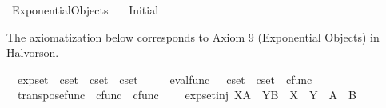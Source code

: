 %
\begin{isabellebody}%
%
%
\isadelimtheory
%
\endisadelimtheory
%
\isatagtheory
{}\isamarkupfalse%
\ Exponential{\isacharunderscore}{\kern0pt}Objects\isanewline
\ \ \ Initial\isanewline
{}%
\endisatagtheory
{\isafoldtheory}%
%
\isadelimtheory
%
\endisadelimtheory
%
\isadelimdocument
%
\endisadelimdocument
%
\isatagdocument
%
\isamarkuptrue%
%
\endisatagdocument
{\isafolddocument}%
%
\isadelimdocument
%
\endisadelimdocument
%
\begin{isamarkuptext}%
The axiomatization below corresponds to Axiom 9 (Exponential Objects) in Halvorson.%
\end{isamarkuptext}\isamarkuptrue%
\isamarkupfalse%
\isanewline
\ \ exp{\isacharunderscore}{\kern0pt}set\ {\isacharcolon}{\kern0pt}{\isacharcolon}{\kern0pt}\ {\isachardoublequoteopen}cset\ {\isasymRightarrow}\ cset\ {\isasymRightarrow}\ cset{\isachardoublequoteclose}\ {\isacharparenleft}{\kern0pt}{\isachardoublequoteopen}{\isacharunderscore}{\kern0pt}\isactrlbsup {\isacharunderscore}{\kern0pt}\isactrlesup {\isachardoublequoteclose}\ {\isacharbrackleft}{\kern0pt}{}{}{}{\isacharcomma}{\kern0pt}{}{}{}{\isacharbrackright}{\kern0pt}{}{}{}{\isacharparenright}{\kern0pt}\ \isanewline
\ \ eval{\isacharunderscore}{\kern0pt}func\ \ {\isacharcolon}{\kern0pt}{\isacharcolon}{\kern0pt}\ {\isachardoublequoteopen}cset\ {\isasymRightarrow}\ cset\ {\isasymRightarrow}\ cfunc{\isachardoublequoteclose}\ \isanewline
\ \ transpose{\isacharunderscore}{\kern0pt}func\ {\isacharcolon}{\kern0pt}{\isacharcolon}{\kern0pt}\ {\isachardoublequoteopen}cfunc\ {\isasymRightarrow}\ cfunc{\isachardoublequoteclose}\ {\isacharparenleft}{\kern0pt}{\isachardoublequoteopen}{\isacharunderscore}{\kern0pt}\isactrlsup {\isasymsharp}{\isachardoublequoteclose}\ {\isacharbrackleft}{\kern0pt}{}{}{}{\isacharbrackright}{\kern0pt}{}{}{}{\isacharparenright}{\kern0pt}\isanewline
{}\isanewline
\ \ exp{\isacharunderscore}{\kern0pt}set{\isacharunderscore}{\kern0pt}inj{\isacharcolon}{\kern0pt}\ {\isachardoublequoteopen}X\isactrlbsup A\isactrlesup \ {\isacharequal}{\kern0pt}\ Y\isactrlbsup B\isactrlesup \ {\isasymLongrightarrow}\ X\ {\isacharequal}{\kern0pt}\ Y\ {\isasymand}\ A\ {\isacharequal}{\kern0pt}\ B{\isachardoublequoteclose}\ \isanewline

\end{isabellebody}
